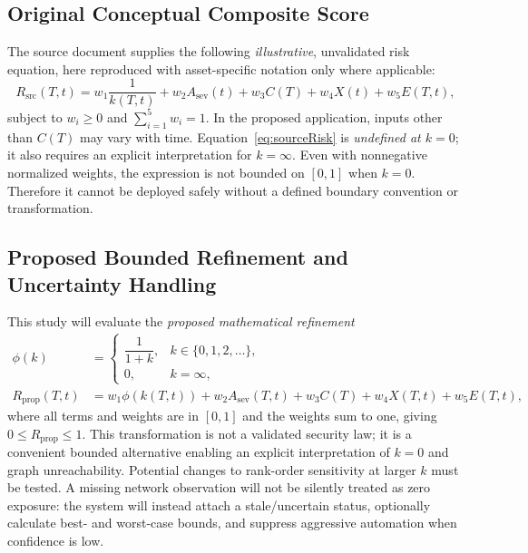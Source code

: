 \documentclass[12pt,a4paper,oneside]{article}
\begin{document}
\subsection{Original Conceptual Composite Score}
The source document supplies the following \emph{illustrative}, unvalidated risk equation, here reproduced with asset-specific notation only where applicable:
\begin{equation}
R_{\mathrm{src}}(T,t)=w_1\frac{1}{k(T,t)}
+w_2 A_{\mathrm{sev}}(t)+w_3 C(T)+w_4 X(t)+w_5 E(T,t),
\label{eq:sourceRisk}
\end{equation}
subject to $w_i\geq 0$ and $\sum_{i=1}^{5}w_i=1$. In the proposed application, inputs other than $C(T)$ may vary with time. Equation~\eqref{eq:sourceRisk} is \emph{undefined at $k=0$}; it also requires an explicit interpretation for $k=\infty$. Even with nonnegative normalized weights, the expression is not bounded on $[0,1]$ when $k=0$. Therefore it cannot be deployed safely without a defined boundary convention or transformation.

\subsection{Proposed Bounded Refinement and Uncertainty Handling}
This study will evaluate the \emph{proposed mathematical refinement}
\begin{align}
\phi(k)&=\begin{cases}\dfrac{1}{1+k},&k\in\{0,1,2,\ldots\},\\[4pt]0,&k=\infty,\end{cases}\label{eq:phi}\\[3pt]
R_{\mathrm{prop}}(T,t)&=w_1\phi(k(T,t))
+w_2 A_{\mathrm{sev}}(T,t)+w_3 C(T)+w_4 X(T,t)+w_5 E(T,t),
\label{eq:proposedRisk}
\end{align}
where all terms and weights are in $[0,1]$ and the weights sum to one, giving $0\le R_{\mathrm{prop}}\le1$. This transformation is not a validated security law; it is a convenient bounded alternative enabling an explicit interpretation of $k=0$ and graph unreachability. Potential changes to rank-order sensitivity at larger $k$ must be tested. A missing network observation will not be silently treated as zero exposure: the system will instead attach a stale/uncertain status, optionally calculate best- and worst-case bounds, and suppress aggressive automation when confidence is low.
\end{document}
